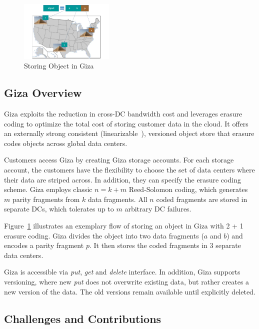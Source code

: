 \begin{figure}[tp]
\centering
\includegraphics[width=0.4\textwidth]{images/giza_example_crop_fit}
\caption{Storing Object in Giza}
\label{fig:giza_example}
\end{figure}

\subsection{Giza Overview}

Giza exploits the reduction in cross-DC bandwidth cost and leverages erasure coding to optimize the total cost of storing customer data in the cloud. It offers an externally strong consistent (linearizable~\cite{herlihy90linearizability}), versioned object store that erasure codes objects across global data centers.

Customers access Giza by creating Giza storage accounts. For each storage account, the customers have the flexibility to choose the set of data centers where their data are striped across. In addition, they can specify the erasure coding scheme. Giza employs classic $n = k + m$ Reed-Solomon coding, which generates $m$ parity fragments from $k$ data fragments. All $n$ coded fragments are stored in separate DCs, which tolerates up to $m$ arbitrary DC failures.

Figure~\ref{fig:giza_example} illustrates an exemplary flow of storing an object in Giza with 2 + 1 erasure coding. Giza divides the object into two data fragments ($a$ and $b$) and encodes a parity fragment $p$. It then stores the coded fragments in $3$ separate data centers. 

Giza is accessible via {\em put}, {\em get} and {\em delete} interface. In addition, Giza supports versioning, where new {\em put} does not overwrite existing data, but rather creates a new version of the data. The old versions remain available until explicitly deleted.

\subsection{Challenges and Contributions}

